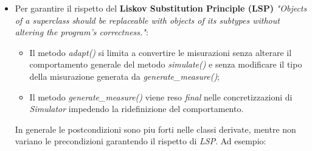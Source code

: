 \begin{itemize}
\begin{itemize}
    \end{itemize}
    \item Per garantire il rispetto del \textbf{Liskov Substitution Principle (LSP)} \textit{"Objects of a superclass should be replaceable with objects of its subtypes without altering the program's correctness."}:
        \begin{itemize}
            \item Il metodo \textit{adapt()} si limita a convertire le misurazioni senza alterare il comportamento generale del metodo \textit{simulate()} e senza modificare il tipo della misurazione generata da \textit{generate\_measure()};
            \item Il metodo \textit{generate\_measure()} viene reso \textit{final} nelle concretizzazioni di \textit{Simulator} impedendo la ridefinizione del comportamento.
        \end{itemize}


        In generale le postcondizioni sono piu forti nelle classi derivate, mentre non variano le precondizioni garantendo il rispetto di \textit{LSP}. Ad esempio:


\end{itemize}
